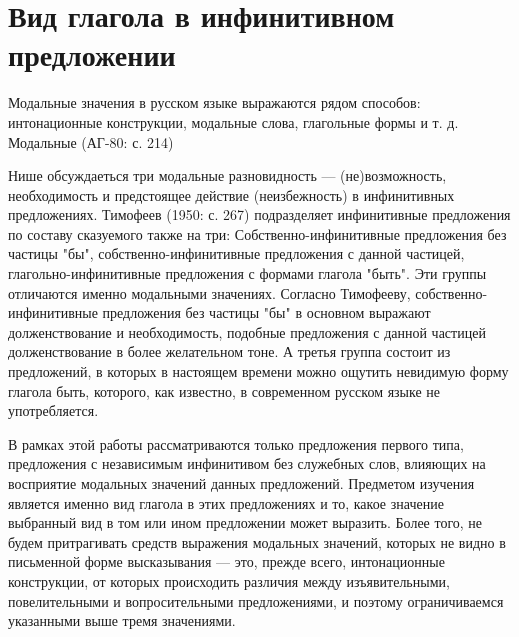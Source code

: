 \section{Вид глагола в инфинитивном предложении}

Модальные значения в русском языке выражаются рядом способов: интонационные конструкции, модальные слова, глагольные формы и т. д. Модальные  (АГ-80: с. 214)


Нише обсуждаеться три модальные разновидность --- (не)возможность, необходимость и предстоящее действие (неизбежность) в инфинитивных предложениях.
Тимофеев (1950: с. 267) подразделяет инфинитивные предложения по составу сказуемого также на три: Собственно-инфинитивные предложения без частицы "бы", собственно-инфинитивные предложения с данной частицей, глагольно-инфинитивные предложения с формами глагола "быть". Эти группы отличаются именно модальными значениях. Согласно Тимофееву, собственно-инфинитивные предложения без частицы "бы" в основном выражают долженствование и необходимость, подобные предложения с данной частицей долженствование в более желательном тоне. А третья группа состоит из предложений, в которых в настоящем времени можно ощутить невидимую форму глагола быть, которого, как известно, в современном русском языке не употребляется.

В рамках этой работы рассматриваются только предложения первого типа, предложения с независимым инфинитивом без служебных слов, влияющих на восприятие модальных значений данных предложений. Предметом изучения является именно вид глагола в этих предложениях и то, какое значение выбранный вид в том или ином предложении может выразить. Более того, не будем притрагивать средств выражения модальных значений, которых не видно в письменной форме высказывания --- это, прежде всего, интонационные конструкции, от которых происходить различия между изъявительными, повелительными и вопросительными предложениями, и поэтому ограничиваемся указанными выше тремя значениями. 




